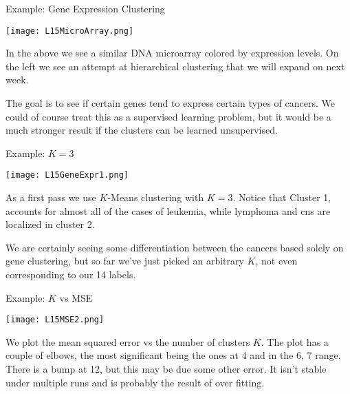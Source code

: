 \documentclass[10pt, table, dvipsnames,xcdraw,handout]{beamer}
\begin{document}
\begin{frame}[fragile]{Example: Gene Expression Clustering}
  \begin{minipage}[t][0.5\textheight][t]{\textwidth}
	\centering \texttt{[image: L15MicroArray.png]} 
  \end{minipage}
  \vfill
\begin{minipage}[t][0.5\textheight][t]{\textwidth}
In the above we see a similar DNA microarray colored by expression levels. On the left we see an attempt at hierarchical clustering that we will expand on next week. \pause

The goal is to see if certain genes tend to express certain types of cancers. We could of course treat this as a supervised learning problem, but it would be a much stronger result if the clusters can be learned unsupervised. 
\end{minipage}
\end{frame}




\begin{frame}[fragile]{Example: $K=3$}
  \begin{minipage}[t][0.5\textheight][t]{\textwidth}
	\centering \texttt{[image: L15GeneExpr1.png]} 
  \end{minipage}
  \vfill
\begin{minipage}[t][0.5\textheight][t]{\textwidth}
As a first pass we use $K$-Means clustering with $K=3$. Notice that Cluster 1, accounts for almost all of the cases of leukemia, while lymphoma and cns are localized in cluster 2. \pause

We are certainly seeing some differentiation between the cancers based solely on gene clustering, but so far we've just picked an arbitrary $K$, not even corresponding to  our 14 labels. 
\end{minipage}
\end{frame}






\begin{frame}[fragile]{Example: $K$ vs MSE}
  \begin{minipage}[t][0.5\textheight][t]{\textwidth}
	\centering \texttt{[image: L15MSE2.png]} 
  \end{minipage}
  \vfill
\begin{minipage}[t][0.5\textheight][t]{\textwidth}
We plot the mean squared error vs the number of clusters $K$. The plot has a couple of elbows, the most significant being the ones at 4 and in the 6, 7 range. There is a bump at 12, but this may be due some other error. It isn't stable under multiple runs and is probably the result of over fitting.  
\end{minipage}
\end{frame}
\end{document}
